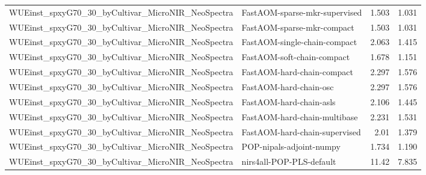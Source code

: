 \begin{landscape}
\begin{longtable}{L{8.0cm}L{9.5cm}rr}
WUEinst\_\allowbreak{}spxyG70\_\allowbreak{}30\_\allowbreak{}byCultivar\_\allowbreak{}MicroNIR\_\allowbreak{}NeoSpectra & FastAOM-\allowbreak{}sparse-\allowbreak{}mkr-\allowbreak{}supervised & 1.503 & 1.031 \\
WUEinst\_\allowbreak{}spxyG70\_\allowbreak{}30\_\allowbreak{}byCultivar\_\allowbreak{}MicroNIR\_\allowbreak{}NeoSpectra & FastAOM-\allowbreak{}sparse-\allowbreak{}mkr-\allowbreak{}compact & 1.503 & 1.031 \\
WUEinst\_\allowbreak{}spxyG70\_\allowbreak{}30\_\allowbreak{}byCultivar\_\allowbreak{}MicroNIR\_\allowbreak{}NeoSpectra & FastAOM-\allowbreak{}single-\allowbreak{}chain-\allowbreak{}compact & 2.063 & 1.415 \\
WUEinst\_\allowbreak{}spxyG70\_\allowbreak{}30\_\allowbreak{}byCultivar\_\allowbreak{}MicroNIR\_\allowbreak{}NeoSpectra & FastAOM-\allowbreak{}soft-\allowbreak{}chain-\allowbreak{}compact & 1.678 & 1.151 \\
WUEinst\_\allowbreak{}spxyG70\_\allowbreak{}30\_\allowbreak{}byCultivar\_\allowbreak{}MicroNIR\_\allowbreak{}NeoSpectra & FastAOM-\allowbreak{}hard-\allowbreak{}chain-\allowbreak{}compact & 2.297 & 1.576 \\
WUEinst\_\allowbreak{}spxyG70\_\allowbreak{}30\_\allowbreak{}byCultivar\_\allowbreak{}MicroNIR\_\allowbreak{}NeoSpectra & FastAOM-\allowbreak{}hard-\allowbreak{}chain-\allowbreak{}osc & 2.297 & 1.576 \\
WUEinst\_\allowbreak{}spxyG70\_\allowbreak{}30\_\allowbreak{}byCultivar\_\allowbreak{}MicroNIR\_\allowbreak{}NeoSpectra & FastAOM-\allowbreak{}hard-\allowbreak{}chain-\allowbreak{}asls & 2.106 & 1.445 \\
WUEinst\_\allowbreak{}spxyG70\_\allowbreak{}30\_\allowbreak{}byCultivar\_\allowbreak{}MicroNIR\_\allowbreak{}NeoSpectra & FastAOM-\allowbreak{}hard-\allowbreak{}chain-\allowbreak{}multibase & 2.231 & 1.531 \\
WUEinst\_\allowbreak{}spxyG70\_\allowbreak{}30\_\allowbreak{}byCultivar\_\allowbreak{}MicroNIR\_\allowbreak{}NeoSpectra & FastAOM-\allowbreak{}hard-\allowbreak{}chain-\allowbreak{}supervised & 2.01 & 1.379 \\
WUEinst\_\allowbreak{}spxyG70\_\allowbreak{}30\_\allowbreak{}byCultivar\_\allowbreak{}MicroNIR\_\allowbreak{}NeoSpectra & POP-\allowbreak{}nipals-\allowbreak{}adjoint-\allowbreak{}numpy & 1.734 & 1.190 \\
WUEinst\_\allowbreak{}spxyG70\_\allowbreak{}30\_\allowbreak{}byCultivar\_\allowbreak{}MicroNIR\_\allowbreak{}NeoSpectra & nirs4all-\allowbreak{}POP-\allowbreak{}PLS-\allowbreak{}default & 11.42 & 7.835 \\

\end{longtable}
\end{landscape}
